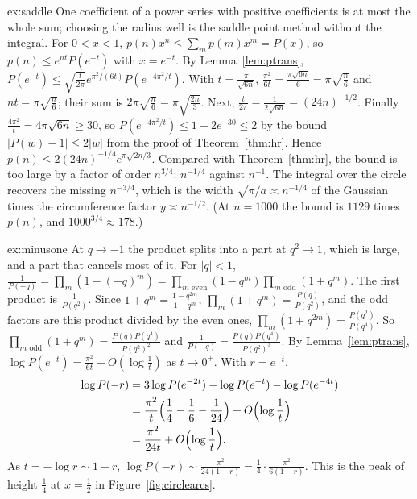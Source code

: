 \begin{solution}{ex:saddle}
\idea One coefficient of a power series with positive coefficients is at most the whole sum; choosing the radius well is the saddle point method without the integral.
\writeup For $0<x<1$, $p(n)x^n\le\sum_mp(m)x^m=P(x)$, so $p(n)\le e^{nt}P(e^{-t})$ with $x=e^{-t}$. By Lemma~\ref{lem:ptrans}, $P(e^{-t})\le\sqrt{\frac t{2\pi}}e^{\pi^2/(6t)}P(e^{-4\pi^2/t})$. With $t=\frac\pi{\sqrt{6n}}$, $\frac{\pi^2}{6t}=\frac{\pi\sqrt{6n}}6=\pi\sqrt{\frac n6}$ and $nt=\pi\sqrt{\frac n6}$; their sum is $2\pi\sqrt{\frac n6}=\pi\sqrt{\frac{2n}3}$. Next, $\frac t{2\pi}=\frac1{2\sqrt{6n}}=(24n)^{-1/2}$. Finally $\frac{4\pi^2}t=4\pi\sqrt{6n}\ge30$, so $P(e^{-4\pi^2/t})\le1+2e^{-30}\le2$ by the bound $|P(w)-1|\le2|w|$ from the proof of Theorem~\ref{thm:hr}. Hence $p(n)\le2(24n)^{-1/4}e^{\pi\sqrt{2n/3}}$. Compared with Theorem~\ref{thm:hr}, the bound is too large by a factor of order $n^{3/4}$: $n^{-1/4}$ against $n^{-1}$. The integral over the circle recovers the missing $n^{-3/4}$, which is the width $\sqrt{\pi/a}\asymp n^{-1/4}$ of the Gaussian times the circumference factor $y\asymp n^{-1/2}$. (At $n=1000$ the bound is $1129$ times $p(n)$, and $1000^{3/4}\approx178$.)
\end{solution}

\begin{solution}{ex:minusone}
\idea At $q\to-1$ the product splits into a part at $q^2\to1$, which is large, and a part that cancels most of it.
\writeup For $|q|<1$, $\frac1{P(-q)}=\prod_m(1-(-q)^m)=\prod_{m\text{ even}}(1-q^m)\prod_{m\text{ odd}}(1+q^m)$. The first product is $\frac1{P(q^2)}$. Since $1+q^m=\frac{1-q^{2m}}{1-q^m}$, $\prod_m(1+q^m)=\frac{P(q)}{P(q^2)}$, and the odd factors are this product divided by the even ones, $\prod_m(1+q^{2m})=\frac{P(q^2)}{P(q^4)}$. So $\prod_{m\text{ odd}}(1+q^m)=\frac{P(q)P(q^4)}{P(q^2)^2}$ and $\frac1{P(-q)}=\frac{P(q)P(q^4)}{P(q^2)^3}$.
By Lemma~\ref{lem:ptrans}, $\log P(e^{-t})=\frac{\pi^2}{6t}+O(\log\frac1t)$ as $t\to0^+$. With $r=e^{-t}$,
\[
\begin{aligned}\log P(-r)&=3\log P(e^{-2t})-\log P(e^{-t})-\log P(e^{-4t})\\&=\frac{\pi^2}t\Bigl(\frac14-\frac16-\frac1{24}\Bigr)+O\Bigl(\log\frac1t\Bigr)\\&=\frac{\pi^2}{24t}+O\Bigl(\log\frac1t\Bigr).\end{aligned}
\]
As $t=-\log r\sim1-r$, $\log P(-r)\sim\frac{\pi^2}{24(1-r)}=\frac14\cdot\frac{\pi^2}{6(1-r)}$. This is the peak of height $\frac14$ at $x=\frac12$ in Figure~\ref{fig:circlearcs}.
\end{solution}

